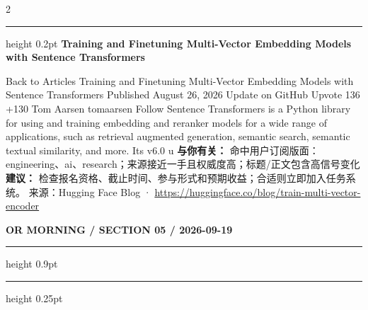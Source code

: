 \documentclass[10.5pt]{ctexart}
\begin{document}
\begin{multicols}{2}
\vspace{2mm}
\hrule height 0.2pt
\vspace{2mm}
{\large\bfseries Training and Finetuning Multi-Vector Embedding Models with Sentence Transformers}\par
Back to Articles Training and Finetuning Multi-Vector Embedding Models with Sentence Transformers Published August 26, 2026 Update on GitHub Upvote 136 +130 Tom Aarsen tomaarsen Follow Sentence Transformers is a Python library for using and training embedding and reranker models for a wide range of applications, such as retrieval augmented generation, semantic search, semantic textual similarity, and more. Its v6.0 u
\textbf{与你有关：} 命中用户订阅版面：engineering、ai、research；来源接近一手且权威度高；标题/正文包含高信号变化
\textbf{建议：} 检查报名资格、截止时间、参与形式和预期收益；合适则立即加入任务系统。
{\footnotesize\color{ormuted} 来源：Hugging Face Blog · \url{https://huggingface.co/blog/train-multi-vector-encoder}}
\end{multicols}
\newpage
{\small\bfseries OR MORNING / SECTION 05 / 2026-09-19}
\vspace{2mm}
\hrule height 0.9pt
\vspace{1.5mm}
\hrule height 0.25pt
\vspace{4mm}
\end{document}
